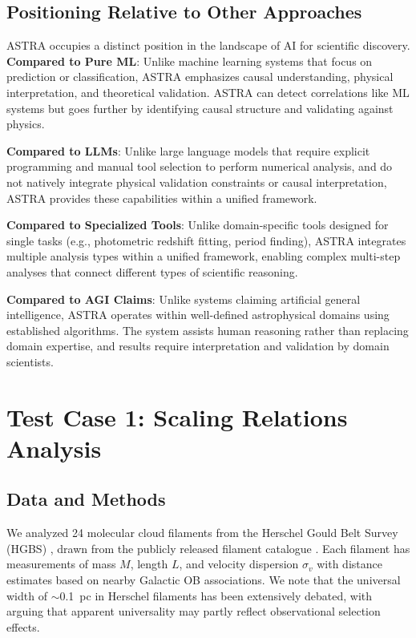 \documentclass[usenatbib]{rasti}
\begin{document}
\subsection{Positioning Relative to Other Approaches}

ASTRA occupies a distinct position in the landscape of AI for scientific discovery. \textbf{Compared to Pure ML}: Unlike machine learning systems that focus on prediction or classification, ASTRA emphasizes causal understanding, physical interpretation, and theoretical validation. ASTRA can detect correlations like ML systems but goes further by identifying causal structure and validating against physics.

\textbf{Compared to LLMs}: Unlike large language models that require explicit programming and manual tool selection to perform numerical analysis, and do not natively integrate physical validation constraints or causal interpretation, ASTRA provides these capabilities within a unified framework.

\textbf{Compared to Specialized Tools}: Unlike domain-specific tools designed for single tasks (e.g., photometric redshift fitting, period finding), ASTRA integrates multiple analysis types within a unified framework, enabling complex multi-step analyses that connect different types of scientific reasoning.

\textbf{Compared to AGI Claims}: Unlike systems claiming artificial general intelligence, ASTRA operates within well-defined astrophysical domains using established algorithms. The system assists human reasoning rather than replacing domain expertise, and results require interpretation and validation by domain scientists.

\section{Test Case 1: Scaling Relations Analysis}

\subsection{Data and Methods}

We analyzed 24 molecular cloud filaments from the Herschel Gould Belt Survey (HGBS) \cite{andre2010}, drawn from the publicly released filament catalogue \cite{arzoumanian2019}. Each filament has measurements of mass $M$, length $L$, and velocity dispersion $\sigma_v$ with distance estimates based on nearby Galactic OB associations. We note that the universal width of $\sim$0.1~pc in Herschel filaments has been extensively debated, with \cite{panopoulou2022} arguing that apparent universality may partly reflect observational selection effects.
\end{document}
